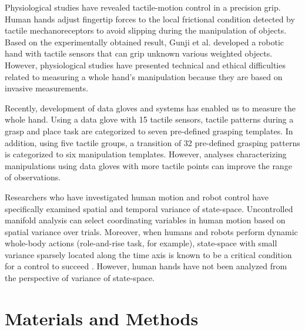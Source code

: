 \documentclass[letterpaper, 10 pt, conference]{IEEEtran}  %
\begin{document}
Physiological studies have revealed tactile-motion control in a precision grip. Human hands adjust fingertip forces to the local frictional condition detected by tactile mechanoreceptors to avoid slipping during the manipulation of objects\cite{SensorimotorControlOfManipulationJohansson}. Based on the experimentally obtained result, Gunji et al. developed a robotic hand with tactile sensors that can grip unknown various weighted objects\cite{slipandgrip}. However, physiological studies have presented technical and ethical difficulties related to measuring a whole hand's manipulation because they are based on invasive measurements.

Recently, development of data gloves and systems has enabled us to measure the whole hand. Using a data glove with 15 tactile sensors, tactile patterns during a grasp and place task are categorized to seven pre-defined grasping templates\cite{Faria}. In addition, using five tactile groups, a transition of 32 pre-defined grasping patterns is categorized to six manipulation templates\cite{Kondo}. However, analyses characterizing manipulations using data gloves with more tactile points can improve the range of observations. 

Researchers who have investigated human motion and robot control have specifically examined spatial and temporal variance of state-space. Uncontrolled manifold analysis can select coordinating variables in human motion based on spatial variance over trials\cite{nonaka2013motor}. Moreover, when humans and robots perform dynamic whole-body actions (role-and-rise task, for example), state-space with small variance sparsely located along the time axis is known to be a critical condition for a control to succeed \cite{kuniyoshi2007emergence}. However, human hands have not been analyzed from the perspective of variance of state-space.


\section{Materials and Methods}
\end{document}
